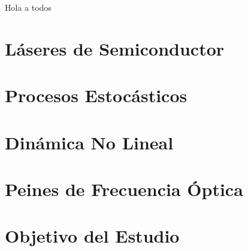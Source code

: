 Hola a todos


	\section{Láseres de Semiconductor}
		\label{Intr:LsrSmcdtr}
		

	\section{Procesos Estocásticos}
		\label{Intr:PrcsEstcs}
		

	\section{Dinámica No Lineal}
		\label{Intr:NonLnr}
		
%
	\section{Peines de Frecuencia Óptica}
		\label{Intr:OFC}
		
		

	\section{Objetivo del Estudio}
		\label{Intr:Obj}
		
